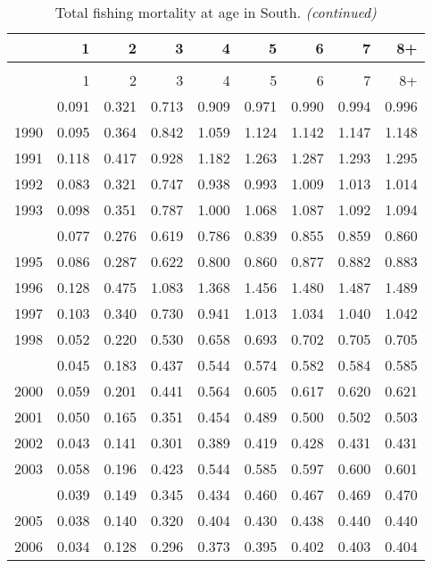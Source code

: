 \documentclass[
]{article}
\begin{document}
\begin{longtable}[t]{lrrrrrrrr}
\caption{\label{tab:South-region-FAA-table}Total fishing mortality at age in South.}\\
\toprule
  & 1 & 2 & 3 & 4 & 5 & 6 & 7 & 8+\\
\midrule
\endfirsthead
\caption[]{Total fishing mortality at age in South. \textit{(continued)}}\\
\toprule
  & 1 & 2 & 3 & 4 & 5 & 6 & 7 & 8+\\
\midrule
\endhead

\endfoot
\bottomrule
\endlastfoot
1989 & 0.091 & 0.321 & 0.713 & 0.909 & 0.971 & 0.990 & 0.994 & 0.996\\
1990 & 0.095 & 0.364 & 0.842 & 1.059 & 1.124 & 1.142 & 1.147 & 1.148\\
1991 & 0.118 & 0.417 & 0.928 & 1.182 & 1.263 & 1.287 & 1.293 & 1.295\\
1992 & 0.083 & 0.321 & 0.747 & 0.938 & 0.993 & 1.009 & 1.013 & 1.014\\
1993 & 0.098 & 0.351 & 0.787 & 1.000 & 1.068 & 1.087 & 1.092 & 1.094\\
\addlinespace
1994 & 0.077 & 0.276 & 0.619 & 0.786 & 0.839 & 0.855 & 0.859 & 0.860\\
1995 & 0.086 & 0.287 & 0.622 & 0.800 & 0.860 & 0.877 & 0.882 & 0.883\\
1996 & 0.128 & 0.475 & 1.083 & 1.368 & 1.456 & 1.480 & 1.487 & 1.489\\
1997 & 0.103 & 0.340 & 0.730 & 0.941 & 1.013 & 1.034 & 1.040 & 1.042\\
1998 & 0.052 & 0.220 & 0.530 & 0.658 & 0.693 & 0.702 & 0.705 & 0.705\\
\addlinespace
1999 & 0.045 & 0.183 & 0.437 & 0.544 & 0.574 & 0.582 & 0.584 & 0.585\\
2000 & 0.059 & 0.201 & 0.441 & 0.564 & 0.605 & 0.617 & 0.620 & 0.621\\
2001 & 0.050 & 0.165 & 0.351 & 0.454 & 0.489 & 0.500 & 0.502 & 0.503\\
2002 & 0.043 & 0.141 & 0.301 & 0.389 & 0.419 & 0.428 & 0.431 & 0.431\\
2003 & 0.058 & 0.196 & 0.423 & 0.544 & 0.585 & 0.597 & 0.600 & 0.601\\
\addlinespace
2004 & 0.039 & 0.149 & 0.345 & 0.434 & 0.460 & 0.467 & 0.469 & 0.470\\
2005 & 0.038 & 0.140 & 0.320 & 0.404 & 0.430 & 0.438 & 0.440 & 0.440\\
2006 & 0.034 & 0.128 & 0.296 & 0.373 & 0.395 & 0.402 & 0.403 & 0.404\\

\end{longtable}
\end{document}
